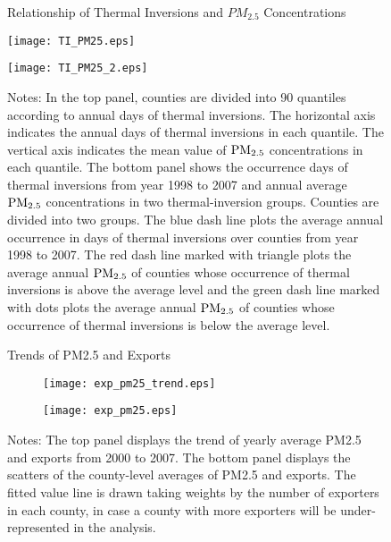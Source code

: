 \documentclass[12pt]{article}
\begin{document}
  \begin{figure}[H]
    \caption{Relationship of Thermal Inversions and $PM_{2.5}$ Concentrations}\label{fig:3}
    \centering
    \begin{minipage}[b]{0.8\textwidth}
      \texttt{[image: TI\_PM25.eps]}
    \end{minipage}
    \begin{minipage}[b]{0.8\textwidth}
      \texttt{[image: TI\_PM25\_2.eps]}
    \end{minipage}
    \small
    \caption*{Notes: In the top panel, counties are divided into 90 quantiles according to annual days of thermal inversions. The horizontal axis indicates the annual days of thermal inversions in each quantile. The vertical axis indicates the mean value of $\rm PM_{2.5}$ concentrations in each quantile. The bottom panel shows the occurrence days of thermal inversions from year 1998 to 2007 and annual average $\rm PM_{2.5}$ concentrations in two thermal-inversion groups. Counties are divided into two groups. The blue dash line plots the average annual occurrence in days of thermal inversions over counties from year 1998 to 2007. The red dash line marked with triangle plots the average annual $\rm PM_{2.5}$ of counties whose occurrence of thermal inversions is above the average level and the green dash line marked with dots plots the average annual
    $\rm PM_{2.5}$ of counties whose occurrence of thermal inversions is below the average level.}
  \end{figure}

  \begin{figure}[H]\centering
    \centering
     \caption{Trends of PM2.5 and Exports}\label{fig:4}
      \begin{subfigure}[b]{.75\textwidth}
       \centering
        \texttt{[image: exp\_pm25\_trend.eps]}
        \caption{}\label{fig:fig_4a}
        \end{subfigure}
%
         \begin{subfigure}[b]{.75\textwidth}
         \centering
         \texttt{[image: exp\_pm25.eps]}
          \caption{}\label{fig:fig_4b}
          \end{subfigure}
    \small
    \caption*{Notes: The top panel displays the trend of yearly average PM2.5 and exports from 2000 to 2007. The bottom panel displays the scatters of the county-level averages of PM2.5 and exports. The  fitted value line is drawn taking weights by the number of exporters in each county, in case a county with more exporters will be under-represented in the analysis.}
  \end{figure}
  \let\clearpage\relax
\end{document}
